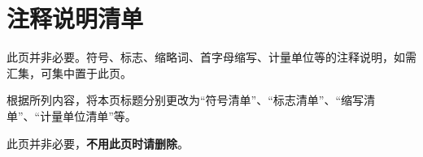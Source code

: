 {\centering\chapter*{注释说明清单}}  %

此页并非必要。符号、标志、缩略词、首字母缩写、计量单位等的注释说明，如需汇集，可集中置于此页。 

根据所列内容，将本页标题分别更改为“符号清单”、“标志清单”、“缩写清单”、“计量单位清单”等。 

此页并非必要，\textbf{不用此页时请删除}。